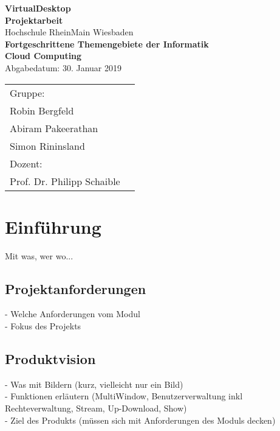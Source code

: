 \documentclass[a4paper, 12pt]{scrreprt}
\begin{document}
\begin{titlepage}
    \begin{center}
    \LARGE \textbf{VirtualDesktop} \\
    \vspace{2.5cm}
    \large\textbf{Projektarbeit}\\
    \vspace{2.5cm}
    \normalsize
    Hochschule RheinMain Wiesbaden \\
    \vspace{2cm}
    \large \textbf{Fortgeschrittene Themengebiete der Informatik\\ Cloud Computing\\}
    \vspace{1cm}
    \normalsize
    Abgabedatum: 30. Januar 2019\\
    \vspace{2.7cm}
    \end{center}
 \normalsize{
    \begin{tabular}{ll}
    	Gruppe: & \\
    	Robin Bergfeld & \\
    	Abiram Pakeerathan & \\
    	Simon Rininsland & \\[0.5cm]
    	Dozent: &\\
        Prof. Dr. Philipp Schaible & \\
    \end{tabular}
    }
\end{titlepage}



\clearpage
\tableofcontents
\clearpage



\chapter{Einführung}
Mit was, wer wo...

\section{Projektanforderungen}
- Welche Anforderungen vom Modul\\
- Fokus des Projekts

\section{Produktvision}
- Was mit Bildern (kurz, vielleicht nur ein Bild)\\
- Funktionen erläutern (MultiWindow, Benutzerverwaltung inkl Rechteverwaltung, Stream, Up-Download, Show)\\
- Ziel des Produkts (müssen sich mit Anforderungen des Moduls decken)\\
\end{document}
